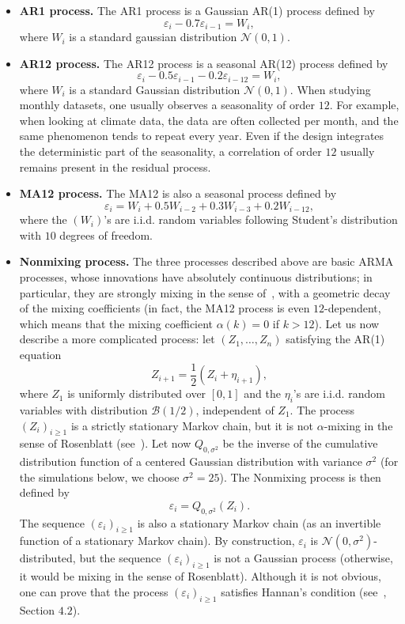 \begin{itemize}
\item {\bf AR1 process.} The AR1 process  is a Gaussian AR(1)  process defined by
\[\varepsilon_{i} - 0.7 \varepsilon_{i-1} = W_{i},\]
where $W_{i}$ is a standard gaussian distribution $\mathcal{N}(0,1)$.

\item {\bf AR12 process.} The AR12 process is a seasonal AR(12)  process defined by
\[\varepsilon_{i} - 0.5 \varepsilon_{i-1} - 0.2 \varepsilon_{i-12} = W_{i},\]
where $W_{i}$ is a standard Gaussian distribution $\mathcal{N}(0,1)$.
When studying monthly datasets, one usually observes a seasonality of order $12$. For example, when looking at climate data, the data are often collected per month, and the same phenomenon tends to repeat every year. Even if the design integrates the deterministic part of the seasonality, a correlation of order $12$ usually remains present in the residual process.

\item {\bf MA12 process.} The MA12 is also a seasonal process defined by
\[\varepsilon_{i} = W_{i} + 0.5 W_{i-2} + 0.3 W_{i-3} + 0.2 W_{i-12},\]
where the $(W_{i})$'s are i.i.d. random variables following Student's distribution with $10$ degrees of freedom.

\item {\bf Nonmixing process.} The three processes described above are basic ARMA processes, whose innovations have absolutely continuous distributions; in particular, they are strongly mixing in the sense of~\cite{rosenblatt1956central}, with a geometric decay of the mixing coefficients (in fact, the MA12 process is even $12$-dependent, which means that the mixing coefficient $\alpha(k) = 0$ if $k > 12$). Let us now describe a more complicated process: let  $(Z_{1}, \ldots, Z_{n})$ satisfying the AR(1) equation
$$Z_{i+1} = \frac{1}{2} (Z_{i} + \eta_{i+1}),$$
where $Z_{1}$ is uniformly distributed over $[0,1]$ and the $\eta_{i}$'s are i.i.d. random variables with distribution $\mathcal{B}(1/2)$, independent of $Z_{1}$.
The process $(Z_{i})_{i \geq 1}$ is a strictly stationary Markov chain, but it is not $\alpha$-mixing in the sense of Rosenblatt (see~\cite{bradley1985basic}). Let now $Q_{0,\sigma^{2}}$ be the inverse of the cumulative distribution function of a centered Gaussian distribution with variance $\sigma^{2}$ (for the simulations below, we choose $\sigma^{2} = 25$). The Nonmixing process is then defined by
\[\varepsilon_{i} = Q_{0,\sigma^{2}}(Z_{i}).\]
The sequence $(\varepsilon_{i})_{i \geq 1}$ is also a stationary Markov chain (as an invertible function of a stationary Markov chain). By construction, $\varepsilon_{i}$ is $\mathcal{N}(0, \sigma^{2})$-distributed, but the sequence $(\varepsilon_{i})_{i \geq 1}$ is not a Gaussian process (otherwise, it would be mixing in the sense of Rosenblatt).
Although it is not obvious, one can prove that the process $(\varepsilon_{i})_{i \geq 1}$ satisfies Hannan's condition (see~\cite{caron2019}, Section $4.2$).


\end{itemize}

